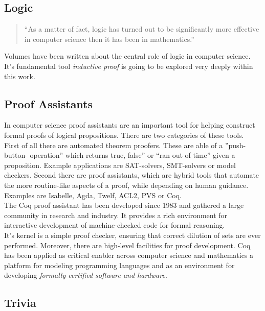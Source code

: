 \subsection{Logic}
\label{subsec:logic}

\begin{quote}
``As a matter of fact, logic has turned out to be significantly more effective in computer science then it has been in mathematics.'' \cite{PACGGHSY} 
\end{quote}
Volumes have been written about the central role of logic in computer science. 
It's fundamental tool {\itshape inductive proof} is going to be explored very deeply within this work.


\subsection{Proof Assistants}
\label{subsec:proofassistants}

In computer science proof assistants are an important tool for helping construct formal proofs of logical propositions.
There are two categories of these tools.\\
First of all there are automated theorem proofers. 
These are able of a ''push-button- operation'' which returns true, false'' or ``ran out of time'' given a proposition.
Example applications are \glspl{SAT-solver}, \glspl{SMT-solver} or \glspl{model checker}. 
Second there are proof assistants, which are hybrid tools that automate the more routine-like aspects of a proof, while depending on human guidance. 
Examples are \gls{Isabelle}, Agda, Twelf, ACL2, PVS or Coq.\\
The Coq proof assistant has been developed since 1983 and gathered a large community in research and industry.
It provides a rich environment for interactive development of machine-checked code for formal reasoning.\\
It's kernel is a simple proof checker, ensuring that correct dilution of sets are ever performed. 
Moreover, there are high-level facilities for proof development.
Coq has been applied as critical enabler across computer science and mathematics a platform for modeling programming languages and as an environment for developing {\itshape formally certified software and hardware}.
 

\subsection{Trivia}
\label{subsec:trivia}

